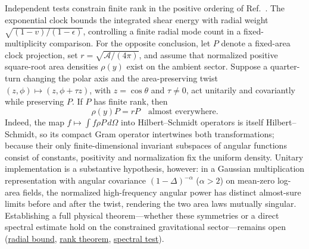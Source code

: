 \documentclass[10pt,a4paper]{article}
\numberwithin{equation}{section}
\newcommand{\repo}[2]{\href{https://github.com/sprajs/quantum-gravity/blob/main/#1}{#2}}
\begin{document}
Independent tests constrain finite rank in the positive ordering of Ref.~\cite{Chandrasekaran2026}. The exponential clock bounds the integrated shear energy with radial weight $\sqrt{(1-v)/(1-\epsilon)}$, controlling a finite radial mode count in a fixed-multiplicity comparison. For the opposite conclusion, let $P$ denote a fixed-area clock projection, set $r=\sqrt{\mathcal A/(4\pi)}$, and assume that normalized positive square-root area densities $\rho(y)$ exist on the ambient sector. Suppose a quarter-turn changing the polar axis and the area-preserving twist $(z,\phi)\mapsto(z,\phi+\tau z)$, with $z=\cos\theta$ and $\tau\ne0$, act unitarily and covariantly while preserving $P$. If $P$ has finite rank, then
\[
                       \rho(y)P=rP\quad\text{almost everywhere}.
\]
Indeed, the map $f\mapsto\int f\rho P\,d\Omega$ into Hilbert--Schmidt operators is itself Hilbert--Schmidt, so its compact Gram operator intertwines both transformations; because their only finite-dimensional invariant subspaces of angular functions consist of constants, positivity and normalization fix the uniform density. Unitary implementation is a substantive hypothesis, however: in a Gaussian multiplication representation with angular covariance $(1-\Delta)^{-\alpha}$ ($\alpha>2$) on mean-zero log-area fields, the normalized high-frequency angular power has distinct almost-sure limits before and after the twist, rendering the two area laws mutually singular. Establishing a full physical theorem---whether these symmetries or a direct spectral estimate hold on the constrained gravitational sector---remains open (\repo{audit/rank-energy-test.md}{radial bound}, \repo{audit/rank-symmetry.md}{rank theorem}, \repo{audit/angular-gaussian.md}{spectral test}).
\end{document}
